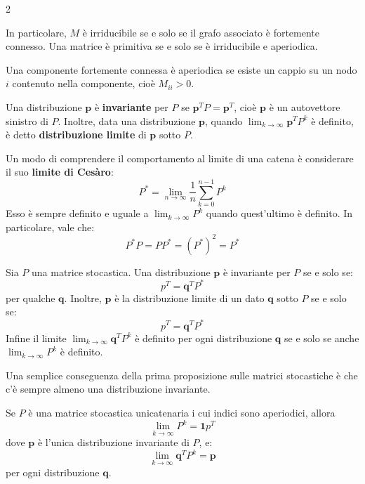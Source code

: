 \documentclass[\main/main.tex]{subfiles}
\begin{document}
\begin{multicols}{2}
\begin{definition}
    In particolare, \(M\) è irriducibile se e solo se il grafo associato è fortemente connesso. Una matrice è primitiva se e solo se è irriducibile e aperiodica.
\end{definition}
\begin{observation}
    Una componente fortemente connessa è aperiodica se esiste un cappio su un nodo \(i\) contenuto nella componente, cioè \(M_{ii} > 0\). 
\end{observation}
\begin{definition}
    Una distribuzione \(\bm{p}\) è \textbf{invariante} per \(P\) se \(\bm{p}^{T} P=\bm{p}^{T}\), cioè \(\bm{p}\) è un autovettore sinistro di \(P\). Inoltre, data una distribuzione \(\bm{p}\), quando \(
        \lim _{k \rightarrow \infty} \boldsymbol{p}^{T} P^{k}
    \) è definito, è detto \textbf{distribuzione limite} di \(\bm{p}\) sotto \(P\).
\end{definition}
\begin{definition}
    Un modo di comprendere il comportamento al limite di una catena è considerare il suo \textbf{limite di Cesàro}:
    \[
        P^{*}=\lim _{n \rightarrow \infty} \frac{1}{n} \sum_{k=0}^{n-1} P^{k}
    \]
    Esso è sempre definito e uguale a \(\lim _{k \rightarrow \infty} P^{k}\) quando quest'ultimo è definito. In particolare, vale che:
    \[
        P^{*} P=P P^{*}=\left(P^{*}\right)^{2}=P^{*}
    \]
\end{definition}
\begin{proposition}
    Sia \(P\) una matrice stocastica. Una distribuzione \(\bm{p}\) è invariante per \(P\) se e solo se:
    \[
        p^{T}=\boldsymbol{q}^{T} P^{*}
    \]
    per qualche \(\bm{q}\). Inoltre, \(\bm{p}\) è la distribuzione limite di un dato \(\bm{q}\) sotto \(P\) se e solo se:
    \[
        p^{T}=\boldsymbol{q}^{T} P^{*}
    \]
    Infine il limite \(
        \lim _{k \rightarrow \infty} \boldsymbol{q}^{T} P^{k}
    \) è definito per ogni distribuzione \(\bm{q}\) se e solo se anche \(
        \lim _{k \rightarrow \infty} P^{k}
    \) è definito.
\end{proposition}
\begin{observation}
    Una semplice conseguenza della prima proposizione sulle matrici stocastiche è che c'è sempre almeno una distribuzione invariante.
\end{observation}
\begin{proposition}
    Se \(P\) è una matrice stocastica unicatenaria i cui indici sono aperiodici, allora
    \[
        \lim _{k \rightarrow \infty} P^{k}=\mathbf{1} p^{T}
    \]
    dove \(\bm{p}\) è l'unica distribuzione invariante di \(P\), e:
    \[
        \lim _{k \rightarrow \infty} \boldsymbol{q}^{T} P^{k}=\boldsymbol{p}
    \]
    per ogni distribuzione \(\bm{q}\).
\end{proposition}
\end{multicols}
\end{document}
